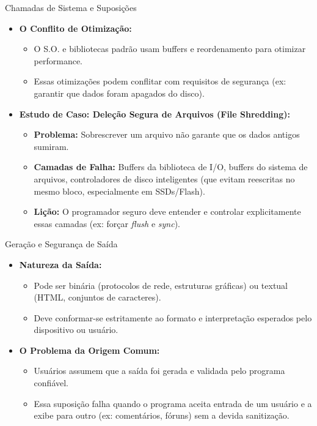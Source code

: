 \begin{frame}{Chamadas de Sistema e Suposições}
    \begin{itemize}
        \item \textbf{O Conflito de Otimização:}
              \begin{itemize}
                  \item O S.O. e bibliotecas padrão usam buffers e reordenamento para otimizar performance.
                  \item Essas otimizações podem conflitar com requisitos de segurança (ex: garantir que dados foram apagados do disco).
              \end{itemize}

        \item \textbf{Estudo de Caso: Deleção Segura de Arquivos (File Shredding):}
              \begin{itemize}
                  \item \textbf{Problema:} Sobrescrever um arquivo não garante que os dados antigos sumiram.
                  \item \textbf{Camadas de Falha:} Buffers da biblioteca de I/O, buffers do sistema de arquivos, controladores de disco inteligentes (que evitam reescritas no mesmo bloco, especialmente em SSDs/Flash).
                  \item \textbf{Lição:} O programador seguro deve entender e controlar explicitamente essas camadas (ex: forçar \textit{flush} e \textit{sync}).
              \end{itemize}
    \end{itemize}
\end{frame}

\begin{frame}{Geração e Segurança de Saída}
    \begin{itemize}
        \item \textbf{Natureza da Saída:}
              \begin{itemize}
                  \item Pode ser binária (protocolos de rede, estruturas gráficas) ou textual (HTML, conjuntos de caracteres).
                  \item Deve conformar-se estritamente ao formato e interpretação esperados pelo dispositivo ou usuário.
              \end{itemize}

        \item \textbf{O Problema da Origem Comum:}
              \begin{itemize}
                  \item Usuários assumem que a saída foi gerada e validada pelo programa confiável.
                  \item Essa suposição falha quando o programa aceita entrada de um usuário e a exibe para outro (ex: comentários, fóruns) sem a devida sanitização.
              \end{itemize}
    \end{itemize}
\end{frame}

